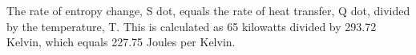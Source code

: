 The rate of entropy change, S dot, equals the rate of heat transfer, Q dot, divided by the temperature, T. This is calculated as 65 kilowatts divided by 293.72 Kelvin, which equals 227.75 Joules per Kelvin.